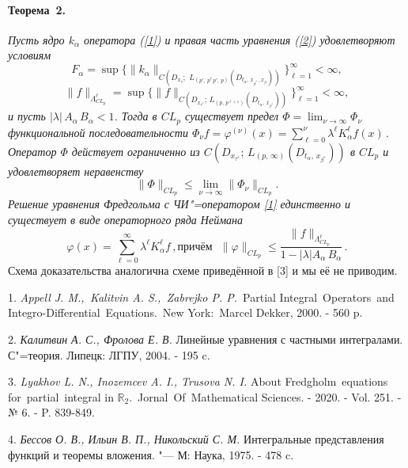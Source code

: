 \paragraph{Теорема~2.}
{\it Пусть
ядро $k_\alpha$ оператора (\ref{1}) и правая часть уравнения (\ref{2}) удовлетворяют условиям
$$F_\alpha=\sup \biggl\{\|k_{\alpha}\|_{C(D_{x_\tau};\,\, L_{(p',\,p^\ell\, p',\, p)}(D_{t_\alpha,\, x_{\beta^*}\,, x_\beta}))}\biggl\}_{\ell=1}^\infty<\infty,$$
 $$\|f\|_{\Lambda_{CL_p}^{\ell}}=\sup \biggl\{\|f\|_{C(D_{x_{\tau^*}};\,L_{(p,\,p^{\ell+1})}(D_{t_\alpha,\,x_{\beta^*}}))}\biggl\}_{\ell=1}^\infty<\infty,$$
и пусть    $|\lambda|\,A_\alpha\,B_\alpha<1$. Тогда в  $CL_p$ существует предел  $\Phi=\lim_{\nu\to\infty}\Phi_\nu$
функциональной последовательности
$
\Phi_\nu f= \varphi^{(\nu)}(x)=\sum\limits_{\ell=0}^\nu \lambda^\ell K_\alpha^\ell f(x)\,.
$
Оператор $\Phi$ действует ограниченно из $C(D_{x_{\tau^*}};\,L_{(p,\,\infty)}(D_{t_\alpha,\,x_{\beta^*}}))$ в
 $CL_p$  и удовлетворяет неравенству
$$
\|\Phi\|_{CL_p}\leq{\lim_{\overline{\nu\to\infty}}}\|\Phi_\nu\|_{CL_p}.
$$
 Решение уравнения Фредгольма  с ЧИ"=оператором
\eqref{1} единственно и существует в виде операторного ряда Неймана
$$
\varphi(x)=\sum\limits_{\ell=0}^\infty \lambda^\ell K_\alpha^\ell f\,,
\text{причём}\,\,\,\,\|\varphi\|_{CL_{p}}\leq\frac{\|f\|_{\Lambda_{CL_p}^\ell}}{1-|\lambda| A_\alpha\,B_\alpha}\,.
$$}
Схема доказательства аналогична схеме приведённой в [3] и мы её не приводим.

\litlist


1. {\it Appell J. M.,\, Kalitvin A. S.,\, Zabrejko P. P.}\, Partial Integral\, Operators\, and\, Integro-Differential\, Equations.\, New York:\, Marcel Dekker, 2000. - 560 p.

2. {\it Калитвин А. С., Фролова Е. В.}
Линейные уравнения с частными интегралами. С"=теория. Липецк: ЛГПУ, 2004. - 195 c.

3. {\it Lyakhov L. N., Inozemcev A. I., Trusova N. I.} About Fredgholm\, equations\, for\, partial\, integral in $\mathbb{R}_2$.\, Jornal\, Of\, Mathematical Sciences. - 2020. - Vol. 251. - № 6. - P. 839-849.

4. {\it Бессов О. В., Ильин В. П., Никольский С. М.} Интегральные представления функций и теоремы вложения. "--- М: Наука, 1975. - 478 c.
